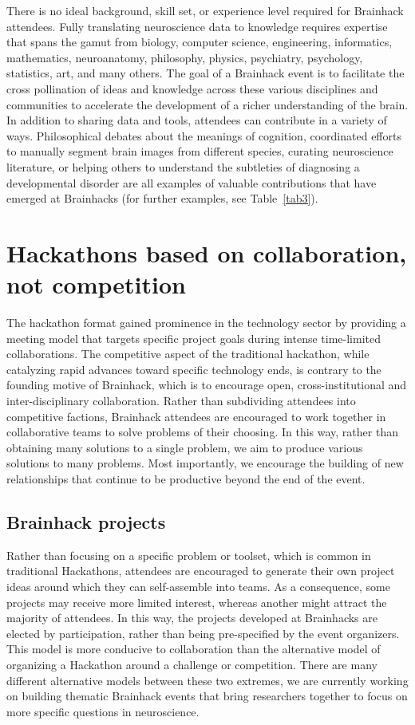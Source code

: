 \documentclass[11pt]{bmc_article_s50}
\begin{document}
There is no ideal background, skill set, or experience level required for Brainhack attendees. Fully translating neuroscience data to knowledge requires expertise that spans the gamut from biology, computer science, engineering, informatics, mathematics, neuroanatomy, philosophy, physics, psychiatry, psychology, statistics, art, and many others. The goal of a Brainhack event is to facilitate the cross pollination of ideas and knowledge across these various disciplines and communities to accelerate the development of a richer understanding of the brain. In addition to sharing data and tools, attendees can contribute in a variety of ways. Philosophical debates about the meanings of cognition, coordinated efforts to manually segment brain images from different species, curating neuroscience literature, or helping others to understand the subtleties of diagnosing a developmental disorder are all examples of valuable contributions that have emerged at Brainhacks (for further examples, see Table~\ref{tab3}).

\section{Hackathons based on collaboration, not competition}

The hackathon format gained prominence in the technology sector by providing a meeting model that targets specific project goals during intense time-limited collaborations. The competitive aspect of the traditional hackathon, while catalyzing rapid advances toward specific technology ends, is contrary to the founding motive of Brainhack, which is to encourage open, cross-institutional and inter-disciplinary collaboration. Rather than subdividing attendees into competitive factions, Brainhack attendees are encouraged to work together in collaborative teams to solve problems of their choosing. In this way, rather than obtaining many solutions to a single problem, we aim to produce various solutions to many problems. Most importantly, we encourage the building of new relationships that continue to be productive beyond the end of the event.

\subsection{Brainhack projects}

Rather than focusing on a specific problem or toolset, which is common in traditional Hackathons, attendees are encouraged to generate their own project ideas around which they can self-assemble into teams. As a consequence, some projects may receive more limited interest, whereas another might attract the majority of attendees. In this way, the projects developed at Brainhacks are elected by participation, rather than being pre-specified by the event organizers. This model is more conducive to collaboration than the alternative model of organizing a Hackathon around a challenge or competition. There are many different alternative models between these two extremes,  we are currently working on building thematic Brainhack events that bring researchers together to focus on more specific questions in neuroscience.
\end{document}
